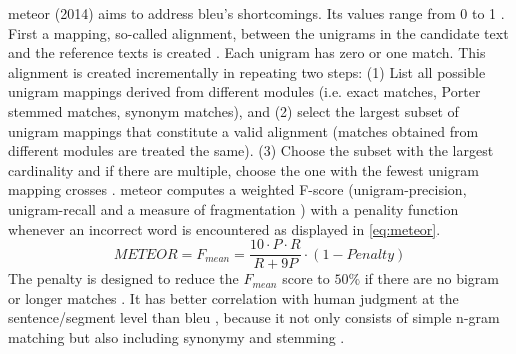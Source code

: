 \ac{meteor} (2014) aims to address \ac{bleu}'s shortcomings.
Its values range from 0 to 1 \citep{kurt_pehlivanoglu_comparative_2024}.
First a mapping, so-called alignment, between the unigrams in the candidate text and the reference texts is created \citep{banerjee_METEOR_2005}.
Each unigram has zero or one match.
This alignment is created incrementally in repeating two steps:
(1) List all possible unigram mappings derived from different modules (i.e. exact matches, Porter stemmed matches, synonym matches), 
and (2) select the largest subset of unigram mappings that constitute a valid alignment 
(matches obtained from different modules are treated the same).
(3) Choose the subset with the largest cardinality and if there are multiple, 
choose the one with the fewest unigram mapping crosses \citep{banerjee_METEOR_2005}.
\ac{meteor} computes a weighted F-score 
(unigram-precision, unigram-recall \citep{kurt_pehlivanoglu_comparative_2024,banerjee_METEOR_2005} 
and a measure of fragmentation \citep{banerjee_METEOR_2005,kurt_pehlivanoglu_comparative_2024})
with a penality function whenever an incorrect word is encountered \citep{palivela_optimization_2021} as displayed in \autoref{eq:meteor}.
\begin{equation}
    METEOR = F_{mean} = \frac{10 \cdot P \cdot R}{R + 9P} \cdot (1 - Penalty)
\label{eq:meteor}
\end{equation}
The penalty is designed to reduce the $F_{mean}$ score to $50\%$ if there are no bigram or longer matches \citep{banerjee_METEOR_2005}.
It has better correlation with human judgment at the sentence/segment level than \ac{bleu} \citep{zhou_paraphrase_2021}, 
because it not only consists of simple n-gram matching but also including synonymy and stemming \citep{kurt_pehlivanoglu_comparative_2024}.


